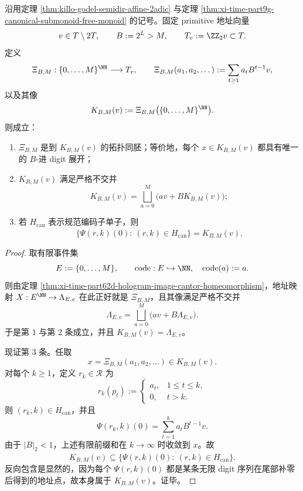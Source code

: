 \begin{theorem}\label{thm:xi-time-part9gc-canonical-godel-cantor-attractor-orbit-closure}
沿用定理 \ref{thm:killo-godel-semidir-affine-2adic} 与定理
\ref{thm:xi-time-part9g-canonical-submonoid-free-monoid} 的记号。固定 primitive 地址向量
\[
v\in T\setminus 2T,
\qquad
B:=2^L>M,
\qquad
T_v:=\ZZ_2v\subset T.
\]
定义
\[
\Xi_{B,M}:\{0,\dots,M\}^{\NN}\longrightarrow T_v,
\qquad
\Xi_{B,M}(a_1,a_2,\dots):=\sum_{t\ge 1}a_tB^{t-1}v,
\]
以及其像
\[
K_{B,M}(v):=\Xi_{B,M}\bigl(\{0,\dots,M\}^{\NN}\bigr).
\]
则成立：
\begin{enumerate}
  \item \(\Xi_{B,M}\) 是到 \(K_{B,M}(v)\) 的拓扑同胚；等价地，每个 \(x\in K_{B,M}(v)\) 都具有唯一的 \(B\)-进 digit 展开；
  \item \(K_{B,M}(v)\) 满足严格不交并
  \[
  K_{B,M}(v)=\bigsqcup_{a=0}^{M}\bigl(av+B K_{B,M}(v)\bigr);
  \]
  \item 若 \(H_{\mathrm{can}}\) 表示规范编码子单子，则
  \[
  \overline{\{\Psi(r,k)(0):\ (r,k)\in H_{\mathrm{can}}\}}
  =
  K_{B,M}(v).
  \]
\end{enumerate}
\end{theorem}
\begin{proof}
取有限事件集
\[
E:=\{0,\dots,M\},
\qquad
\mathrm{code}:E\hookrightarrow \NN,\quad \mathrm{code}(a):=a.
\]
则由定理 \ref{thm:xi-time-part62d-hologram-image-cantor-homeomorphism}，地址映射 \(X:E^{\NN}\to \Lambda_{E,v}\) 在此正好就是 \(\Xi_{B,M}\)，且其像满足严格不交并
\[
\Lambda_{E,v}
=
\bigsqcup_{a=0}^{M}\bigl(av+B\Lambda_{E,v}\bigr).
\]
于是第 \(1\) 与第 \(2\) 条成立，并且 \(K_{B,M}(v)=\Lambda_{E,v}\)。

现证第 \(3\) 条。任取
\[
x=\Xi_{B,M}(a_1,a_2,\dots)\in K_{B,M}(v).
\]
对每个 \(k\ge 1\)，定义 \(r_k\in \mathcal R\) 为
\[
r_k(p_t):=
\begin{cases}
a_t,& 1\le t\le k,\\
0,& t>k.
\end{cases}
\]
则 \((r_k,k)\in H_{\mathrm{can}}\)，并且
\[
\Psi(r_k,k)(0)=\sum_{t=1}^{k}a_tB^{t-1}v.
\]
由于 \(|B|_2<1\)，上述有限前缀和在 \(k\to\infty\) 时收敛到 \(x\)。故
\[
K_{B,M}(v)\subseteq
\overline{\{\Psi(r,k)(0):\ (r,k)\in H_{\mathrm{can}}\}}.
\]
反向包含是显然的，因为每个 \(\Psi(r,k)(0)\) 都是某条无限 digit 序列在尾部补零后得到的地址点，故本身属于 \(K_{B,M}(v)\)。证毕。
\end{proof}

